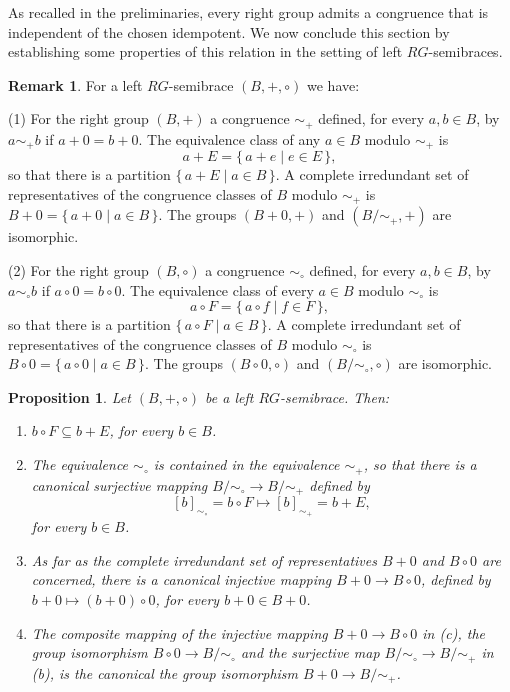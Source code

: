 \documentclass[11pt]{amsart}
\newtheorem{proposition}[theorem]{Proposition}
\theoremstyle{definition}
\newtheorem{remark}[theorem]{Remark}
\begin{document}
As recalled in the preliminaries, every right group admits a congruence that is independent of the chosen idempotent. We now conclude this section by establishing some properties of this relation in the setting of left $RG$-semibraces.

\begin{remark} 

{\rm For a left $RG$-semibrace $(B,+,\circ)$ we have:

(1) For the right group  $(B,+)$ a congruence $\sim_+$ defined, for every $a,b\in B$, by $a\sim_+ b$ if $a+ 0=b+0$. The equivalence class of any $a\in B$ modulo $\sim_+$ is 
$$
a+E=\{\,a+e\mid e\in E\,\},
$$ 
so that there is a partition $\{\,a+E\mid a\in B\,\}$. A complete irredundant set of representatives of the congruence classes of $B$ modulo $\sim_+$ is $B+ 0=\{\,a+ 0\mid a\in B\,\}$. The groups $(B+0,+)$ and $(B/{\sim_+},+)$ are isomorphic. 

(2) For the right group  $(B,\circ)$ a congruence $\sim_\circ$ defined, for every $a,b\in B$, by $a\sim _\circ b$ if $a\circ 0=b\circ 0$. The equivalence class of every $a\in B$ modulo $\sim_\circ$ is 
$$
a\circ F=\{\,a\circ f\mid f\in F\,\},
$$ 
so that there is a partition $\{\,a\circ F\mid a\in B\,\}$. A complete irredundant set of representatives of the congruence classes of $B$ modulo $\sim_\circ$ is $B\circ 0=\{\,a\circ 0\mid a\in B\,\}$. The groups $(B\circ 0,\circ)$ and $(B/{\sim_\circ},\circ)$ are isomorphic.} 
\end{remark}

\smallskip

\begin{proposition} Let $(B,+,\circ)$ be a left $RG$-semibrace. Then:
\begin{enumerate}
    \item[\rm (a)] $b\circ F\subseteq b+E$, for every $b\in B$. 


\item[\rm (b)] The equivalence $\sim_\circ$ is contained in the equivalence $\sim_+$, so that there is a canonical surjective mapping $B/{\sim_\circ}\to B/{\sim_+}$ defined by 
$$
[b]_{\sim_\circ}=b\circ F\mapsto [b]_{\sim_+} = b+E,
$$ 
for every $b\in B$.

\item[\rm (c)] As far as the complete irredundant set of representatives $B+ 0$ and $B\circ 0$ are concerned, there is a canonical injective mapping $B+ 0\to B\circ 0$,  defined by $b+ 0\mapsto (b+0)\circ 0$, for every $b+0\in B+0$.

\item[\rm (d)] The composite mapping of the injective mapping $B+ 0\to B\circ 0$ in {\rm (c)}, the group isomorphism $B\circ 0\to B/{\sim_\circ}$ and the surjective map $B/{\sim_\circ}\to B/{\sim_+}$ in {\rm (b)}, is the canonical the group isomorphism  $B+ 0\to B/{\sim_+}$.
\end{enumerate}\end{proposition}
\end{document}
